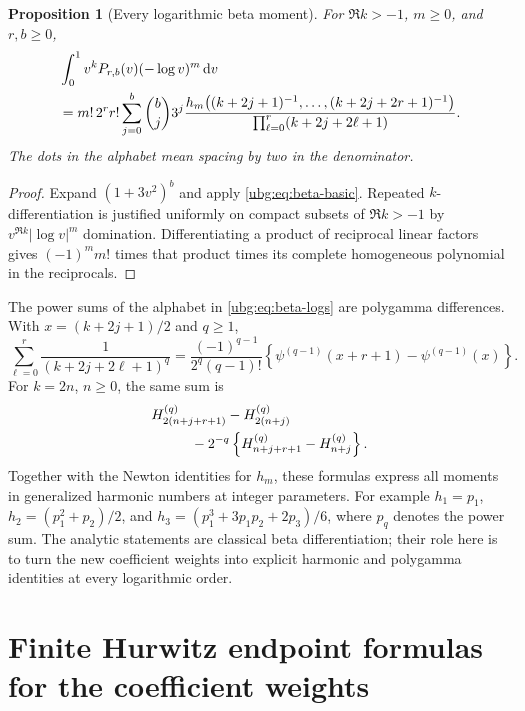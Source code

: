 \documentclass[11pt,letterpaper]{article}
\numberwithin{equation}{section}
\newtheorem{proposition}[theorem]{Proposition}
\theoremstyle{definition}\newtheorem{definition}[theorem]{Definition}
\theoremstyle{remark}\newtheorem{remark}[theorem]{Remark}
\newcommand{\dd}{\,\mathrm d}\newcommand{\ii}{\mathrm i}
\begin{document}
\begin{proposition}[Every logarithmic beta moment]
\label{ubg:prop:beta-logs}
For $\Re k>-1$, $m\ge0$, and $r,b\ge0$,
\begin{align}
 &\int_0^1v^kP_{r,b}(v)(-\log v)^m\dd v\notag\\
 &=m!\,2^rr!\sum_{j=0}^b\binom bj3^j
 \frac{h_m\bigl((k+2j+1)^{-1},\ldots,(k+2j+2r+1)^{-1}\bigr)}
      {\prod_{\ell=0}^r(k+2j+2\ell+1)}.
 \label{ubg:eq:beta-logs}
\end{align}
The dots in the alphabet mean spacing by two in the denominator.
\end{proposition}
\begin{proof}
Expand $(1+3v^2)^b$ and apply \eqref{ubg:eq:beta-basic}. Repeated
$k$-differentiation is justified uniformly on compact subsets of
$\Re k>-1$ by $v^{\Re k}|\log v|^m$ domination. Differentiating a
product of reciprocal linear factors gives $(-1)^m m!$ times that
product times its complete homogeneous polynomial in the reciprocals.
\end{proof}

The power sums of the alphabet in \eqref{ubg:eq:beta-logs} are polygamma
differences. With $x=(k+2j+1)/2$ and $q\ge1$,
\begin{equation}\label{ubg:eq:polygamma-alphabet}
 \sum_{\ell=0}^r\frac1{(k+2j+2\ell+1)^q}
 =\frac{(-1)^{q-1}}{2^q(q-1)!}
       \left\{\psi^{(q-1)}(x+r+1)-\psi^{(q-1)}(x)\right\}.
\end{equation}
For $k=2n$, $n\ge0$, the same sum is
\begin{align}
 &H_{2(n+j+r+1)}^{(q)}-H_{2(n+j)}^{(q)}\notag\\
 &\hspace{1cm}-2^{-q}
       \left\{H_{n+j+r+1}^{(q)}-H_{n+j}^{(q)}\right\}.
 \label{ubg:eq:harmonic-alphabet}
\end{align}
Together with the Newton identities for $h_m$, these formulas express
all moments in generalized harmonic numbers at integer parameters.
For example $h_1=p_1$, $h_2=(p_1^2+p_2)/2$, and
$h_3=(p_1^3+3p_1p_2+2p_3)/6$, where $p_q$ denotes the power sum.
The analytic statements are classical beta differentiation; their role
here is to turn the new coefficient weights into explicit harmonic and
polygamma identities at every logarithmic order.

\section{Finite Hurwitz endpoint formulas for the coefficient weights}
\label{ubg:sec:Hurwitz}
\end{document}
